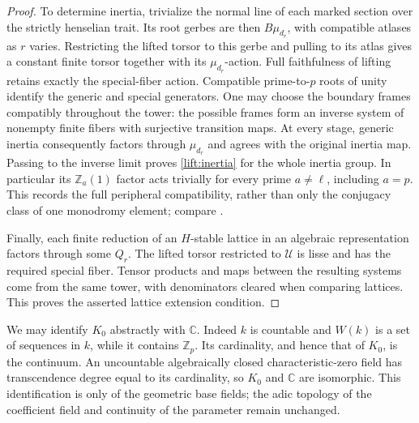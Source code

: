 \begin{proof}
To determine inertia, trivialize the normal line of each marked
section over the strictly henselian trait.  Its root gerbes are
then $B\mu_{d_r}$, with compatible atlases as $r$ varies.
Restricting the lifted torsor to this gerbe and pulling to its atlas
gives a constant finite torsor together with its $\mu_{d_r}$-action.
Full faithfulness of lifting retains exactly the special-fiber
action.  Compatible prime-to-$p$ roots of unity identify the generic
and special generators.  One may choose the boundary frames
compatibly throughout the tower: the possible frames form an
inverse system of nonempty finite fibers with surjective transition
maps.  At every stage, generic inertia consequently
factors through $\mu_{d_r}$ and agrees with the original inertia map.
Passing to the inverse limit proves \eqref{lift:inertia} for the
whole inertia group.  In particular its $\mathbb Z_a(1)$ factor
acts trivially for every prime $a\ne\ell$, including $a=p$.
This records the full peripheral compatibility, rather than only
the conjugacy class of one monodromy element; compare
\cite[Lemma~3.5]{LieblichOlsson}.

Finally, each finite reduction of an $H$-stable lattice in an
algebraic representation factors through some $Q_r$.  The lifted
torsor restricted to $\mathscr U$ is lisse and has the required
special fiber.  Tensor products and maps between the resulting
systems come from the same tower, with denominators cleared when
comparing lattices.  This proves the asserted lattice extension
condition.
\end{proof}

We may identify $K_0$ abstractly with $\mathbb C$.  Indeed $k$ is
countable and $W(k)$ is a set of sequences in $k$, while it contains
$\mathbb Z_p$.  Its cardinality, and hence that of $K_0$, is the
continuum.  An uncountable algebraically closed characteristic-zero
field has transcendence degree equal to its cardinality, so $K_0$
and $\mathbb C$ are isomorphic.  This identification is only of the
geometric base fields; the adic topology of the coefficient field
and continuity of the parameter remain unchanged.

